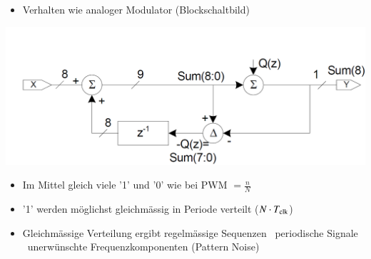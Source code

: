 \begin{minipage}[c]{0.48\columnwidth}
    \raggedright%
    \begin{itemize}
        \item Verhalten wie analoger Modulator (Blockschaltbild)
    \end{itemize}

    \includegraphics[width=\columnwidth]{images/sigma-delta-DAC_blockschaltbild.png}
\end{minipage}
\hfill
\begin{minipage}[c]{0.48\columnwidth}
    \begin{itemize}
        \item Im Mittel gleich viele '1' und '0' wie bei PWM $= \frac{n}{N}$
        \item '1' werden möglichst gleichmässig in Periode verteilt ($N \cdot T_{\rm clk}$)
        \item Gleichmässige Verteilung ergibt regelmässige Sequenzen \textrightarrow\ periodische Signale \textrightarrow\ unerwünschte
            Frequenzkomponenten (Pattern Noise)
    \end{itemize}
\end{minipage}

